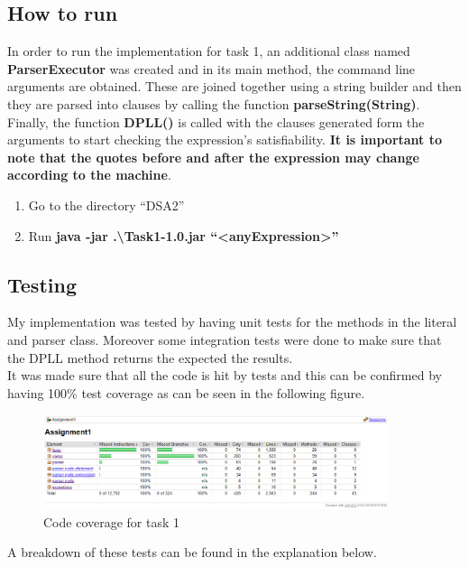 \documentclass{article}
\newcommand{\quotes}[1]{``#1''}
\begin{document}
		
\subsection{How to run}

In order to run the implementation for task 1, an additional class named \textbf{ParserExecutor} was created and in its main method, the command line arguments are obtained. These are joined together using a string builder and then they are parsed into clauses by calling the function \textbf{parseString(String)}. Finally, the function \textbf{DPLL()} is called with the clauses generated form the arguments to start checking the expression's satisfiability. \textbf{It is important to note that the quotes before and after the expression may change according to the machine}.

\begin{enumerate}
\item Go to the directory \quotes{DSA2}
\item Run \textbf{java -jar .\textbackslash Task1-1.0.jar \quotes{\textless anyExpression\textgreater}}
\end{enumerate}

		\subsection{Testing}
		
	My implementation was tested by having unit tests for the methods in the literal and parser class. Moreover some integration tests were done to make sure that the DPLL method returns the expected the results.\\
	It was made sure that all the code is hit by tests and this can be confirmed by having 100\% test coverage as can be seen in the following figure.
	
		\begin{figure}[H]
					\centering
			 			\includegraphics[width=0.9\textwidth]{task1cov.png}
			 			\centering
			  			\caption{Code coverage for task 1}
			  			\label{fig:task1cov}
					\end{figure}
	
	
	A breakdown of these tests can be found in the explanation below.
\end{document}
